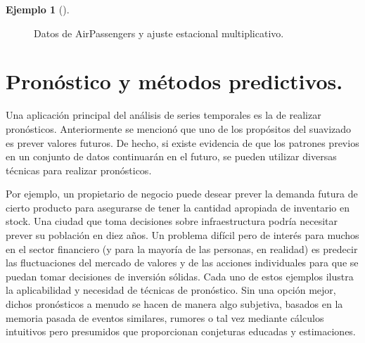 \documentclass[
  us-letterpaper,
]{scrreprt}
\theoremstyle{plain}
\theoremstyle{definition}
\theoremstyle{definition}
\newtheorem{example}{Ejemplo}[chapter]
\theoremstyle{plain}
\theoremstyle{remark}
\begin{document}
\begin{example}[]
\begin{tcolorbox}
\begin{figure}[H]
\begin{minipage}{0.33\linewidth}


\end{minipage}%

\caption{\label{fig-AEmul}Datos de AirPassengers y ajuste estacional
multiplicativo.}

\end{figure}%

\end{tcolorbox}

\end{example}

\section{Pronóstico y métodos
predictivos.}\label{pronuxf3stico-y-muxe9todos-predictivos.}

Una aplicación principal del análisis de series temporales es la de
realizar pronósticos. Anteriormente se mencionó que uno de los
propósitos del suavizado es prever valores futuros. De hecho, si existe
evidencia de que los patrones previos en un conjunto de datos
continuarán en el futuro, se pueden utilizar diversas técnicas para
realizar pronósticos.

Por ejemplo, un propietario de negocio puede desear prever la demanda
futura de cierto producto para asegurarse de tener la cantidad apropiada
de inventario en stock. Una ciudad que toma decisiones sobre
infraestructura podría necesitar prever su población en diez años. Un
problema difícil pero de interés para muchos en el sector financiero (y
para la mayoría de las personas, en realidad) es predecir las
fluctuaciones del mercado de valores y de las acciones individuales para
que se puedan tomar decisiones de inversión sólidas. Cada uno de estos
ejemplos ilustra la aplicabilidad y necesidad de técnicas de pronóstico.
Sin una opción mejor, dichos pronósticos a menudo se hacen de manera
algo subjetiva, basados en la memoria pasada de eventos similares,
rumores o tal vez mediante cálculos intuitivos pero presumidos que
proporcionan conjeturas educadas y estimaciones.
\end{document}
